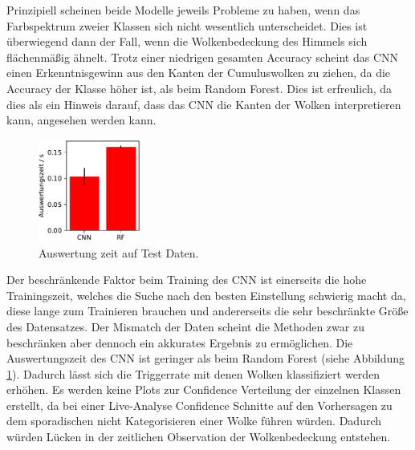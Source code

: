 Prinzipiell scheinen beide Modelle jeweils Probleme zu haben, wenn das 
Farbspektrum zweier Klassen sich nicht wesentlich unterscheidet.
Dies ist überwiegend dann der Fall, wenn die Wolkenbedeckung des Himmels sich
flächenmäßig ähnelt. 
Trotz einer niedrigen gesamten Accuracy scheint das CNN einen 
Erkenntnisgewinn aus den Kanten der Cumuluswolken zu ziehen, da die Accuracy
der Klasse höher ist, als beim Random Forest.
Dies ist erfreulich, da dies als ein Hinweis darauf, dass das CNN 
die Kanten der Wolken interpretieren kann, angesehen werden kann. 

\begin{figure}
		\centering
		\vspace{-0.4cm}
		\includegraphics[width=0.3\textwidth]{pictures/time.pdf}
		\caption{Auswertung zeit auf Test Daten.}
		\label{fig:time}
		\vspace{-0.5cm}
\end{figure}
Der beschränkende Faktor beim Training des CNN ist einerseits die hohe
Trainingszeit, welches die Suche nach den besten Einstellung schwierig macht da, 
diese lange zum Trainieren brauchen und andererseits die sehr
beschränkte Größe des Datensatzes. 
Der Mismatch der Daten scheint die Methoden zwar zu beschränken aber dennoch
ein akkurates Ergebnis zu ermöglichen.
Die Auswertungszeit des CNN ist geringer als beim Random Forest (siehe Abbildung
\ref{fig:time}). 
Dadurch lässt sich die Triggerrate mit denen Wolken klassifiziert werden
erhöhen.
Es werden keine Plots zur Confidence Verteilung der einzelnen Klassen erstellt,
da bei einer Live-Analyse Confidence Schnitte auf den Vorhersagen zu dem 
sporadischen nicht Kategorisieren einer Wolke führen würden.
Dadurch würden Lücken in der zeitlichen Observation der Wolkenbedeckung
entstehen.
